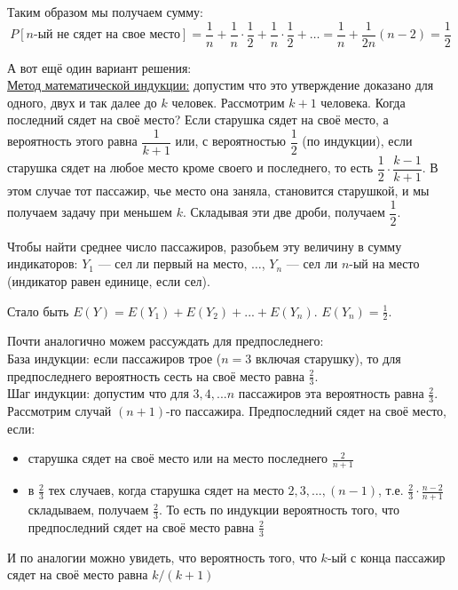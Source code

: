 \documentclass[12pt, a4paper]{article}\usepackage[]{graphicx}\usepackage[]{color}
\begin{document}
\begin{enumerate}
\begin{enumerate}
						Таким образом мы получаем сумму:
						$$
						P[n\text{-ый не сядет на свое место}] = \dfrac{1}{n} + \dfrac{1}{n}\cdot \dfrac{1}{2} + \dfrac{1}{n}\cdot \dfrac{1}{2} + \dots = \dfrac{1}{n}  + \frac{1}{2n}(n-2) = \dfrac{1}{2}
						$$
						\begin{center}
						\end{center}

						А вот ещё один вариант решения: \\
						\underline{Метод математической индукции:} допустим что это утверждение доказано для одного, двух и так далее до $k$ человек. Рассмотрим $k+1$ человека. Когда последний сядет на своё место? Если старушка сядет на своё место, а вероятность этого равна $\dfrac{1}{k+1}$ или, с вероятностью $\dfrac{1}{2}$ (по индукции), если старушка сядет на любое место кроме своего и последнего, то есть $\dfrac{1}{2}\cdot\dfrac{k-1}{k+1}$. В этом случае тот\vspace{0.2cm} пассажир, чье место  она заняла, становится старушкой, и мы получаем задачу при меньшем $k$. Складывая эти две дроби, получаем $\dfrac{1}{2} $.

						Чтобы найти среднее число пассажиров, разобьем эту величину в сумму индикаторов: $Y_1$ — сел ли первый на место, $\dots$, $Y_n$ — сел ли $n$-ый на место (индикатор равен единице, если сел).

						Стало быть $E(Y)=E(Y_1)+E(Y_2)+...+E(Y_n)$. $E(Y_n)=\frac{1}{2}$.

						Почти аналогично можем рассуждать для предпоследнего:\\
						База индукции: если пассажиров трое ($n=3$ включая старушку), то для предпоследнего вероятность сесть на своё место равна $\frac{2}{3}$.\\
						Шаг индукции: допустим что для $3, 4, ... n$ пассажиров эта вероятность равна $\frac{2}{3}$.
						Рассмотрим случай $(n+1)$-го пассажира.
						Предпоследний сядет на своё место, если:

						\renewcommand{\labelitemi}{\textbullet}

						\begin{itemize}
							\item старушка сядет на своё место или на место последнего $\frac{2}{n+1}$
							\item в $\frac{2}{3}$ тех случаев, когда старушка сядет на место $2, 3, ..., (n-1)$, т.е. $\frac{2}{3}\cdot \frac{n-2}{n+1}$
							складываем, получаем $\frac{2}{3}$.
							То есть по индукции вероятность того, что предпоследний сядет на своё место равна $\frac{2}{3}$
						\end{itemize}
						И по аналогии можно увидеть, что вероятность того, что $k$-ый с конца пассажир сядет на своё место равна $k/(k+1)$


\end{enumerate}
\end{enumerate}
\end{document}
